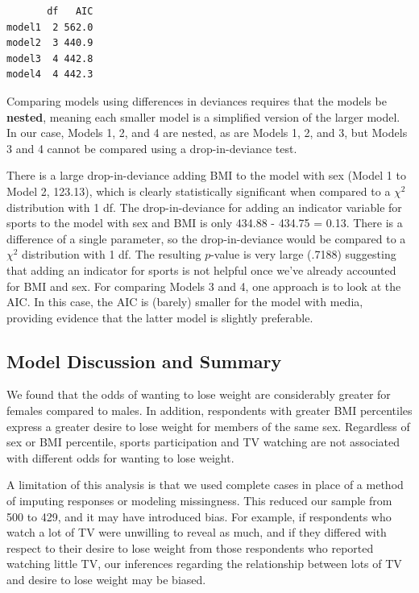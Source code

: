 \documentclass[
]{krantz}
\begin{document}
\begin{verbatim}
       df   AIC
model1  2 562.0
model2  3 440.9
model3  4 442.8
model4  4 442.3
\end{verbatim}

Comparing models using differences in deviances requires that the models be \textbf{nested}, meaning each smaller model is a simplified version of the larger model. In our case, Models 1, 2, and 4 are nested, as are Models 1, 2, and 3, but Models 3 and 4 cannot be compared using a drop-in-deviance test.

There is a large drop-in-deviance adding BMI to the model with sex (Model 1 to Model 2, 123.13), which is clearly statistically significant when compared to a \(\chi^2\) distribution with 1 df. The drop-in-deviance for adding an indicator variable for sports to the model with sex and BMI is only 434.88 - 434.75 = 0.13. There is a difference of a single parameter, so the drop-in-deviance would be compared to a \(\chi^2\) distribution with 1 df. The resulting \(p\)-value is very large (.7188) suggesting that adding an indicator for sports is not helpful once we've already accounted for BMI and sex. For comparing Models 3 and 4, one approach is to look at the AIC. In this case, the AIC is (barely) smaller for the model with media, providing evidence that the latter model is slightly preferable.

\hypertarget{model-discussion-and-summary}{%
\subsection{Model Discussion and Summary}\label{model-discussion-and-summary}}

We found that the odds of wanting to lose weight are considerably greater for females compared to males. In addition, respondents with greater BMI percentiles express a greater desire to lose weight for members of the same sex. Regardless of sex or BMI percentile, sports participation and TV watching are not associated with different odds for wanting to lose weight.

A limitation of this analysis is that we used complete cases in place of a method of imputing responses or modeling missingness. This reduced our sample from 500 to 429, and it may have introduced bias. For example, if respondents who watch a lot of TV were unwilling to reveal as much, and if they differed with respect to their desire to lose weight from those respondents who reported watching little TV, our inferences regarding the relationship between lots of TV and desire to lose weight may be biased.
\end{document}
